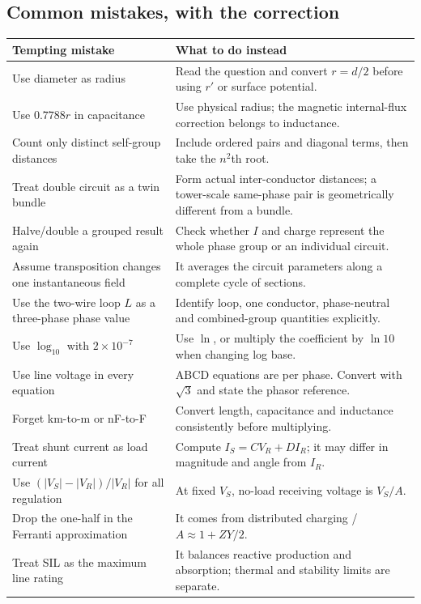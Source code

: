 \documentclass[11pt,a4paper]{article}
\begin{document}
\subsection{Common mistakes, with the correction}
\begin{longtable}{L{.43\textwidth}L{.50\textwidth}}
\toprule Tempting mistake & What to do instead\\\midrule\endhead
Use diameter as radius & Read the question and convert $r=d/2$ before using $r'$ or surface potential.\\
Use $0.7788r$ in capacitance & Use physical radius; the magnetic internal-flux correction belongs to inductance.\\
Count only distinct self-group distances & Include ordered pairs and diagonal terms, then take the $n^2$th root.\\
Treat double circuit as a twin bundle & Form actual inter-conductor distances; a tower-scale same-phase pair is geometrically different from a bundle.\\
Halve/double a grouped result again & Check whether $I$ and charge represent the whole phase group or an individual circuit.\\
Assume transposition changes one instantaneous field & It averages the circuit parameters along a complete cycle of sections.\\
Use the two-wire loop $L$ as a three-phase phase value & Identify loop, one conductor, phase-neutral and combined-group quantities explicitly.\\
Use $\log_{10}$ with $2\times10^{-7}$ & Use $\ln$, or multiply the coefficient by $\ln10$ when changing log base.\\
Use line voltage in every equation & ABCD equations are per phase. Convert with $\sqrt3$ and state the phasor reference.\\
Forget km-to-m or nF-to-F & Convert length, capacitance and inductance consistently before multiplying.\\
Treat shunt current as load current & Compute $I_S=CV_R+DI_R$; it may differ in magnitude and angle from $I_R$.\\
Use $(|V_S|-|V_R|)/|V_R|$ for all regulation & At fixed $V_S$, no-load receiving voltage is $V_S/A$.\\
Drop the one-half in the Ferranti approximation & It comes from distributed charging / $A\approx1+ZY/2$.\\
Treat SIL as the maximum line rating & It balances reactive production and absorption; thermal and stability limits are separate.\\

\end{longtable}
\end{document}
